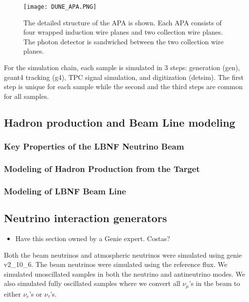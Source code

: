\begin{figure}[!ht]
\centering
\texttt{[image: DUNE\_APA.PNG]}
\caption{The detailed structure of the APA is shown. Each APA consists of four wrapped induction wire planes and two collection wire planes.
The photon detector is sandwiched between the two collection wire planes.}
\label{fig:dune_apa}
\end{figure}

For the simulation chain, each sample is simulated in 3 steps: generation (gen), {\sc geant4} tracking (g4), TPC signal simulation, and digitization (detsim). The first step is unique for each sample while the second and the third steps are common for all samples. 

\subsection{Hadron production and Beam Line modeling}
\label{sec:tools-mc-had-beam}

\subsubsection{Key Properties of the LBNF Neutrino Beam}
\label{ss:tools-beam-properties}

\subsubsection{Modeling of Hadron Production from the Target}
\label{ss:tools-hadron-production-modeling}

\subsubsection{Modeling of LBNF Beam Line}
\label{ss:tools-beam-line-modeling}

\subsection{Neutrino interaction generators} 
\label{sec:tools-mc-gen}

\begin{itemize}
\item Have this section owned by a Genie expert. Costas?
\end{itemize}

Both the beam neutrinos and atmospheric neutrinos were simulated using {\sc genie} v2\_10\_6. The beam neutrinos were simulated using the reference flux. We simulated unoscillated samples in both the neutrino and antineutrino modes. We also simulated fully oscillated samples where we convert all $\nu_\mu$'s in the beam to either $\nu_e$'s or $\nu_\tau$'s. 

